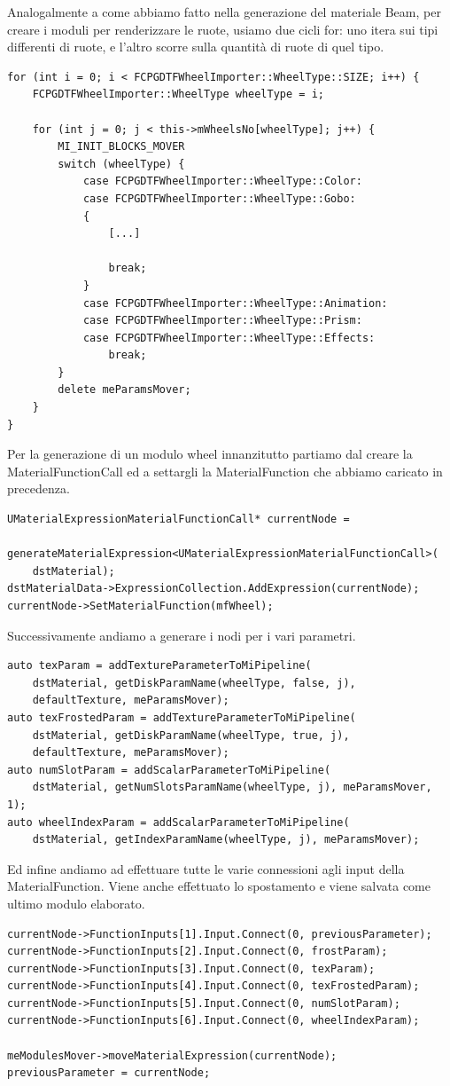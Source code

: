 \documentclass[main.tex]{subfiles}
\begin{document}
Analogalmente a come abbiamo fatto nella generazione del materiale Beam, per creare i moduli per renderizzare le ruote, usiamo due cicli for: uno itera sui tipi differenti di ruote, e l'altro scorre sulla quantità di ruote di quel tipo. 
\begin{lstlisting}
for (int i = 0; i < FCPGDTFWheelImporter::WheelType::SIZE; i++) {
    FCPGDTFWheelImporter::WheelType wheelType = i;

    for (int j = 0; j < this->mWheelsNo[wheelType]; j++) {
        MI_INIT_BLOCKS_MOVER
        switch (wheelType) {
            case FCPGDTFWheelImporter::WheelType::Color:
            case FCPGDTFWheelImporter::WheelType::Gobo:
            {
                [...]
                
                break;
            }
            case FCPGDTFWheelImporter::WheelType::Animation:
            case FCPGDTFWheelImporter::WheelType::Prism:
            case FCPGDTFWheelImporter::WheelType::Effects:
                break;
        }
        delete meParamsMover;
    }
}
\end{lstlisting}
Per la generazione di un modulo wheel innanzitutto partiamo dal creare la MaterialFunctionCall ed a settargli la MaterialFunction che abbiamo caricato in precedenza.
\begin{lstlisting}
UMaterialExpressionMaterialFunctionCall* currentNode =
    generateMaterialExpression<UMaterialExpressionMaterialFunctionCall>(
    dstMaterial);
dstMaterialData->ExpressionCollection.AddExpression(currentNode);
currentNode->SetMaterialFunction(mfWheel);
\end{lstlisting}
Successivamente andiamo a generare i nodi per i vari parametri.
\begin{lstlisting}
auto texParam = addTextureParameterToMiPipeline(
    dstMaterial, getDiskParamName(wheelType, false, j),
    defaultTexture, meParamsMover);
auto texFrostedParam = addTextureParameterToMiPipeline(
    dstMaterial, getDiskParamName(wheelType, true, j),
    defaultTexture, meParamsMover);
auto numSlotParam = addScalarParameterToMiPipeline(
    dstMaterial, getNumSlotsParamName(wheelType, j), meParamsMover, 1);
auto wheelIndexParam = addScalarParameterToMiPipeline(
    dstMaterial, getIndexParamName(wheelType, j), meParamsMover);
\end{lstlisting}
Ed infine andiamo ad effettuare tutte le varie connessioni agli input della MaterialFunction. Viene anche effettuato lo spostamento e viene salvata come ultimo modulo elaborato. 
\begin{lstlisting}
currentNode->FunctionInputs[1].Input.Connect(0, previousParameter);
currentNode->FunctionInputs[2].Input.Connect(0, frostParam);
currentNode->FunctionInputs[3].Input.Connect(0, texParam);
currentNode->FunctionInputs[4].Input.Connect(0, texFrostedParam);
currentNode->FunctionInputs[5].Input.Connect(0, numSlotParam);
currentNode->FunctionInputs[6].Input.Connect(0, wheelIndexParam);

meModulesMover->moveMaterialExpression(currentNode);
previousParameter = currentNode;
\end{lstlisting}
\end{document}
